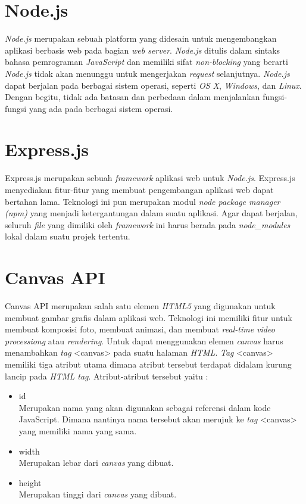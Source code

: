 \section{Node.js}
\label{sec:Node.js}

\textit{Node.js} merupakan sebuah platform yang didesain untuk mengembangkan aplikasi berbasis web pada bagian \textit{web server}. \textit{Node.js} ditulis dalam sintaks bahasa pemrograman \textit{JavaScript} dan memiliki sifat \textit{non-blocking} yang berarti \textit{Node.js} tidak akan menunggu untuk mengerjakan \textit{request} selanjutnya. \textit{Node.js} dapat berjalan pada berbagai sistem operasi, seperti \textit{OS X}, \textit{Windows}, dan \textit{Linux}. Dengan begitu, tidak ada batasan dan perbedaan dalam menjalankan fungsi-fungsi yang ada pada berbagai sistem operasi.




\section{Express.js}
\label{sec:Express.js}

Express.js merupakan sebuah \textit{framework} aplikasi web untuk \textit{Node.js}. Express.js menyediakan fitur-fitur yang membuat pengembangan aplikasi web dapat bertahan lama. Teknologi ini pun merupakan modul \textit{node package manager (npm)} yang menjadi ketergantungan dalam suatu aplikasi. Agar dapat berjalan, seluruh \textit{file} yang dimiliki oleh \textit{framework} ini harus berada pada \textit{node\_modules} lokal dalam suatu projek tertentu. 


\section{Canvas API}
\label{sec:Canvas API}
 
Canvas API merupakan salah satu elemen \textit{HTML5} yang digunakan untuk membuat gambar grafis dalam aplikasi web. Teknologi ini memiliki fitur untuk membuat komposisi foto, membuat animasi, dan membuat \textit{real-time video processiong} atau \textit{rendering}. Untuk dapat menggunakan elemen \textit{canvas} harus menambahkan \textit{tag} <canvas> pada suatu halaman \textit{HTML}. \textit{Tag} <canvas> memiliki tiga atribut utama dimana atribut tersebut terdapat didalam kurung lancip pada \textit{HTML tag}. Atribut-atribut tersebut yaitu : 

\begin{itemize}
	\item id \\
	Merupakan nama yang akan digunakan sebagai referensi dalam kode JavaScript. Dimana nantinya nama tersebut akan merujuk ke \textit{tag} <canvas> yang memiliki nama yang sama.
	\item width \\
	Merupakan lebar dari \textit{canvas} yang dibuat.
	\item height \\
	Merupakan tinggi dari \textit{canvas} yang dibuat.
\end{itemize}

